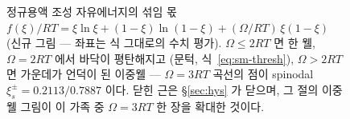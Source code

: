 \documentclass[11pt,a4paper]{article}
\begin{document}
\begin{figure}[t]
\caption{정규용액 조성 자유에너지의 섞임 몫 $f(\xi)/RT=\xi\ln\xi+(1-\xi)\ln(1-\xi)+(\Omega/RT)\,\xi(1-\xi)$
(신규 그림 --- 좌표는 식 그대로의 수치 평가). $\Omega\le2RT$ 면 한 웰, $\Omega=2RT$ 에서 바닥이 평탄해지고
(문턱, 식~\eqref{eq:sm-thresh}), $\Omega>2RT$ 면 가운데가 언덕이 된 이중웰 --- $\Omega=3RT$ 곡선의 점이
spinodal $\xi_s^\pm=0.2113/0.7887$ 이다. 닫힌 근은 \S\ref{sec:hys} 가 닫으며, 그 절의 이중웰 그림이 이 가족
중 $\Omega=3RT$ 한 장을 확대한 것이다.}
\label{fig:sm-gxi}
\end{figure}
\end{document}
